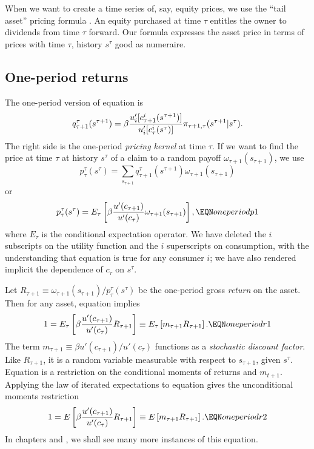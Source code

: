 When we want to create a time series of, say, equity prices,
we use the ``tail asset'' pricing formula .  An equity purchased
at time $\tau$ entitles the owner to  dividends from time
$\tau$ forward.   Our formula  expresses
the asset price in terms of prices with time $\tau$, history
$s^\tau$ good as numeraire.





\subsection{One-period returns}
The one-period version of equation  is
$$q^\tau_{\tau+1}(s^{\tau +1}) = \beta {u'_i[c_{\tau+1}^i(s^{\tau+1})]
    \over u'_i[c_\tau^i(s^\tau)] } 
\pi_{\tau+1,\tau}(s^{\tau+1} \vert s^\tau). $$
The right side is the one-period {\it pricing kernel} at time $\tau$.
If we want to  find the  price  at time $\tau$ at history $s^\tau$
of a claim to a random payoff $\omega_{\tau+1}(s_{\tau+1})$, 
we use
$$ p^\tau_{\tau}(s^\tau) = \sum_{s_{\tau+1}} q^\tau_{\tau+1}(s^{\tau+1})
      \omega_{\tau+1}(s_{\tau+1}) $$
or
$$ p^\tau_{\tau}(s^\tau) = E_\tau \left[\beta {u'(c_{\tau+1}) \over u'(c_{\tau})}
       \omega_{\tau+1}(s_{\tau +1}) \right], \EQN oneperiodp1 $$
where $E_\tau$ is the conditional expectation operator.
We have deleted the $i$ subscripts on the utility function
and the $i$ superscripts on consumption, with the
understanding that equation  is true for any consumer $i$;
we have also rendered implicit the  dependence of $c_{\tau}$ on $s^\tau$.


Let $R_{\tau+1} \equiv \omega_{\tau+1}(s_{\tau+1}) 
/p^\tau_{\tau}(s^\tau) $
 be the one-period gross {\it return} on the asset.
Then for any asset, equation  implies
$$ 1 = E_\tau \left[\beta{u'(c_{\tau+1}) \over u'(c_\tau)} R_{\tau+1} \right]
     \equiv E_\tau \left[ m_{\tau+1} R_{\tau+1} \right]  .
    \EQN oneperiodr1 $$
The term $m_{\tau+1} \equiv \beta u'(c_{\tau+1}) / u'(c_\tau)$
functions as a {\it stochastic discount factor}.    Like
$R_{\tau+1}$, it is a random %
variable  measurable with respect to $s_{\tau+1}$, given
$s^{\tau}$.
    Equation  is a restriction on
the conditional moments of returns and $m_{t+1}$.  Applying
the law of iterated expectations to equation  gives
the unconditional moments restriction
$$ 1 = E \left[\beta{u'(c_{\tau+1}) \over u'(c_\tau)} R_{\tau+1} \right]
     \equiv E \left[ m_{\tau+1} R_{\tau+1} \right]  .
    \EQN oneperiodr2 $$
In chapters  and , we shall see many more instances of this
equation.


